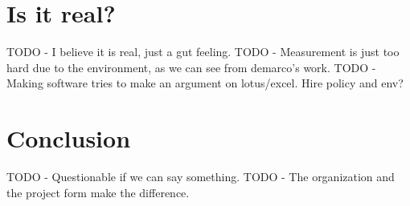 \section*{Is it real?}

TODO - I believe it is real, just a gut feeling.
TODO - Measurement is just too hard due to the environment, as we can see from demarco's work.
TODO - Making software tries to make an argument on lotus/excel. Hire policy and env?

\section*{Conclusion}

TODO - Questionable if we can say something.
TODO - The organization and the project form make the difference.

